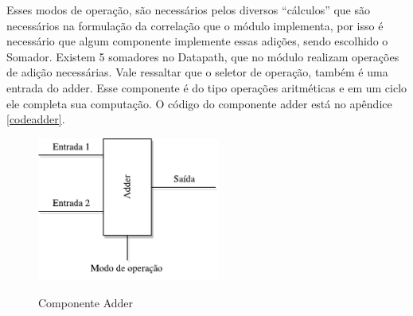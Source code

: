 Esses modos de operação, são necessários pelos diversos “cálculos” que são necessários na formulação da correlação que o módulo implementa, por isso  é necessário que algum componente implemente essas adições, sendo escolhido o Somador.
Existem 5 somadores no Datapath, que no módulo realizam operações de adição necessárias. Vale ressaltar que o seletor de operação, também é uma entrada do adder. Esse componente é do tipo operações aritméticas e em um ciclo ele completa sua computação. O código do componente adder está no apêndice \ref{codeadder}.

\begin{figure}[H]
	\centering
	\includegraphics[width=6cm]{figures/Adder.pdf}\\
	\caption{Componente Adder}
	\label{adder}
\end{figure}

